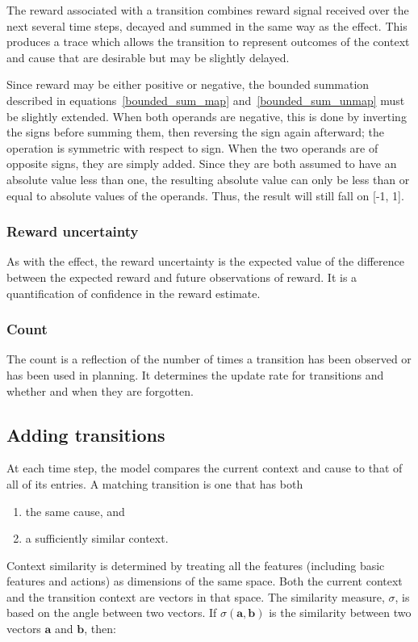 The reward associated with a transition combines reward signal received over the next several time steps, decayed and summed in the same way as the effect. This produces a trace which allows the transition to represent outcomes of the context and cause that are desirable but may be slightly delayed. 

Since reward may be either positive or negative, the bounded summation described in equations~\ref{bounded_sum_map} and~\ref{bounded_sum_unmap} must be slightly extended. When both operands are negative, this is done by inverting the signs before summing them, then reversing the sign again afterward; the operation is symmetric with respect to sign. When the two operands are of opposite signs, they are simply added. Since they are both assumed to have an absolute value less than one, the resulting absolute value can only be less than or equal to absolute values of the operands. Thus, the result will still fall on [-1, 1].

\subsubsection{Reward uncertainty}
As with the effect, the reward uncertainty is the expected value of the difference between the expected reward and future observations of reward. It is a quantification of confidence in the reward estimate.

\subsubsection{Count}
The count is a reflection of the number of times a transition has been observed or has been used in planning. It determines the update rate for transitions and whether and when they are forgotten.

\subsection{Adding transitions}
At each time step, the model compares the current context and cause to that of all of its entries.
A matching transition is one that has both 
\begin{enumerate}
\item the same cause, and 
\item a sufficiently similar context.
\end{enumerate}

Context similarity is determined by treating all the features (including basic features and actions) as dimensions of the same space. Both the current context and the transition context are vectors in that space. The similarity measure, $\sigma$, is based on the angle between two vectors. If $\sigma(\mathbf{a},\mathbf{b})$ is the similarity between two vectors $\mathbf{a}$ and $\mathbf{b}$, then:


